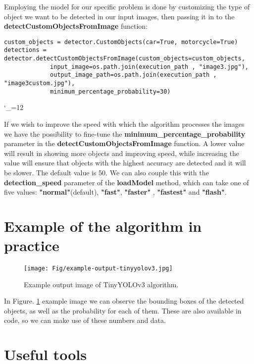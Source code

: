 \documentclass[runningheads,a4paper,11pt]{report}
\newenvironment{simplechar}{%
   \catcode`\_=12
}{}
\begin{document}
Employing the model for our specific problem is done by customizing the type of object we want to be detected in our input images, then passing it in to the \textbf{detectCustomObjectsFromImage} function:

\begin{lstlisting}
custom_objects = detector.CustomObjects(car=True, motorcycle=True)
detections = detector.detectCustomObjectsFromImage(custom_objects=custom_objects,
             input_image=os.path.join(execution_path , "image3.jpg"),
             output_image_path=os.path.join(execution_path , "image3custom.jpg"),
             minimum_percentage_probability=30)
\end{lstlisting}

\begin{simplechar}
If we wish to improve the speed with which the algorithm processes the images we have the possibility to fine-tune the \textbf{minimum_percentage_probability} parameter in the \textbf{detectCustomObjectsFromImage} function. A lower value will result in showing more objects and improving speed, while increasing the value will ensure that objects with the highest accuracy are detected and it will be slower. The default value is 50. We can also couple this with the \textbf{detection_speed} parameter of the \textbf{loadModel} method, which can take one of five values: \textbf{"normal"}(default), \textbf{"fast"}, \textbf{"faster"} , \textbf{"fastest"} and \textbf{"flash"}.
\end{simplechar}

\section{Example of the algorithm in practice}

\begin{figure}[htbp]
	\centerline{\texttt{[image: Fig/example-output-tinyyolov3.jpg]}} 
	\caption{Example output image of TinyYOLOv3 algorithm.}
	\label{fig:TinyYOLOv3ExampleOutput}
\end{figure}

In Figure. \ref{fig:TinyYOLOv3ExampleOutput} example image we can observe the bounding boxes of the detected objects, as well as the probability for each of them. These are also available in code, so we can make use of these numbers and data.

\section{Useful tools}
\label{section:tools}
\end{document}

